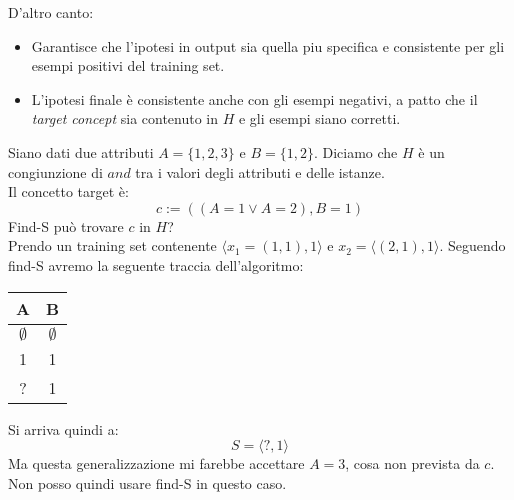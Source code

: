 D'altro canto:
\begin{itemize}
  \item Garantisce che l'ipotesi in output sia quella piu specifica
  e consistente per gli esempi positivi del training set.
  \item L'ipotesi finale è consistente anche con gli esempi negativi, a patto
  che il \textit{target concept} sia contenuto in $H$ e gli esempi siano
  corretti.
\end{itemize}
\begin{esempio}
  Siano dati due attributi $A=\{1, 2, 3\}$ e $B=\{1, 2\}$. Diciamo che $H$ è un
  congiunzione di $and$ tra i valori degli attributi e delle istanze.\\
  Il concetto target è:
  \[c:=((A=1\lor A=2), B=1)\]
  Find-S può trovare $c$ in $H$?\\
  Prendo un training set contenente $\langle x_1=(1, 1), 1\rangle$ e
  $x_2=\langle(2, 1), 1\rangle$. Seguendo find-S 
  avremo la seguente traccia dell'algoritmo:
  \begin{table}[H]
    \centering
    \begin{tabular}{c|c}
      A & B\\
      \hline
      $\emptyset$ & $\emptyset$\\
      1 & 1 \\
      ? & 1
    \end{tabular}
  \end{table}
  Si arriva quindi a:
  \[S=\langle ?, 1\rangle\]
  Ma questa generalizzazione mi farebbe accettare $A=3$, cosa non prevista da
  $c$.\\
  Non posso quindi usare find-S in questo caso.
\end{esempio}
